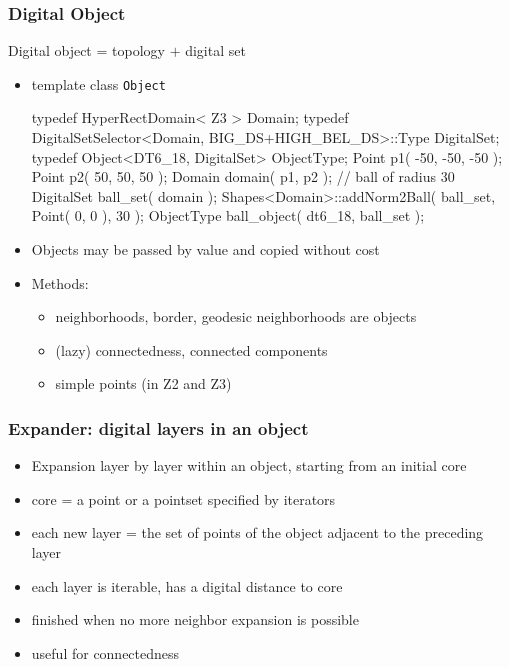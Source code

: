 \documentclass[pdftex,francais]{beamer}
\begin{document}
\begin{frame}[fragile]
  \frametitle{Digital Object}

  \alert{Digital object} = topology $+$ digital set

  \begin{itemize}
  \item template class \texttt{Object}

    \scriptsize
    \begin{semiverbatim}
 typedef HyperRectDomain< Z3 > Domain; 
 typedef DigitalSetSelector<Domain, BIG_DS+HIGH_BEL_DS>::Type DigitalSet;
 typedef Object<DT6_18, DigitalSet> ObjectType;
 Point p1( -50, -50, -50 ); Point p2( 50, 50, 50 );
 Domain domain( p1, p2 );
 // ball of radius 30
 DigitalSet ball_set( domain );
 Shapes<Domain>::addNorm2Ball( ball_set, Point( 0, 0 ), 30 );
 ObjectType ball_object( dt6_18, ball_set );
    \end{semiverbatim}
    \normalsize
  \item Objects may be passed by value and copied without cost
  \item Methods:
    \begin{itemize}
    \item neighborhoods, border, geodesic neighborhoods are objects
    \item (lazy) connectedness, connected components
    \item simple points (in Z2 and Z3)
    \end{itemize}
  \end{itemize}

\end{frame}

\begin{frame}[fragile]
  \frametitle{Expander: digital layers in an object}
  
  \begin{itemize}
  \item Expansion layer by layer within an object, starting from an initial core
  \item core = a point or a pointset specified by iterators
  \item each new layer = the set of points of the object adjacent to
    the preceding layer
  \item each layer is iterable, has a digital distance to core
  \item finished when no more neighbor expansion is possible
  \item useful for \alert{connectedness}
  \end{itemize}
\end{frame}
\end{document}
